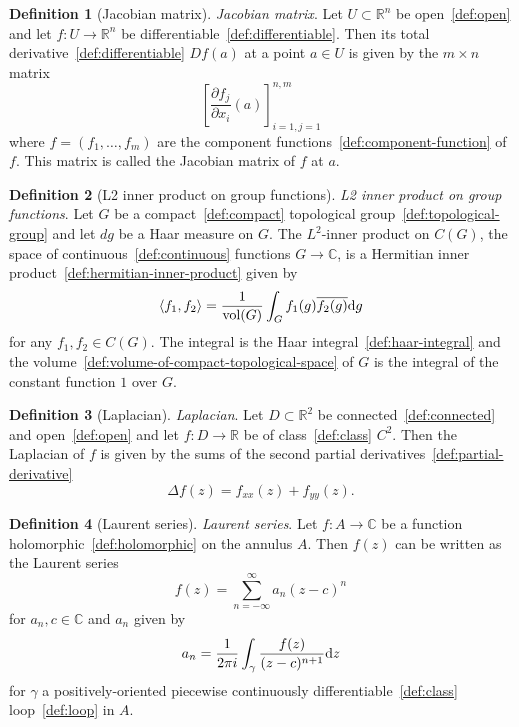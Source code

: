 \documentclass[12pt,a4paper]{article}
\theoremstyle{definition}
\newtheorem{definition}{Definition}
\begin{document}
\begin{definition}[Jacobian matrix]\label{def:jacobian-matrix}
\emph{Jacobian matrix}. Let $U \subset \mathbb R^n$ be open~\ref{def:open} and let $f:U\to\mathbb R^n$ be differentiable~\ref{def:differentiable}. Then its total derivative~\ref{def:differentiable} $Df(a)$ at a point $a\in U$ is given by the $m\times n$ matrix $$\left[ \frac{\partial f_j}{\partial x_i}(a)\right]_{i=1,j=1}^{n,m}$$ where $f = (f_1,\dots, f_m)$ are the component functions~\ref{def:component-function} of $f$. This matrix is called the Jacobian matrix of $f$ at $a$.
\end{definition}

\begin{definition}[L2 inner product on group functions]\label{def:l2-inner-product-on-group-functions}
\emph{L2 inner product on group functions}. Let $G$ be a compact~\ref{def:compact} topological group~\ref{def:topological-group} and let $dg$ be a Haar measure on $G$. The $L^2$-inner product on $C(G)$, the space of continuous~\ref{def:continuous} functions $G\to \mathbb C$, is a Hermitian inner product~\ref{def:hermitian-inner-product} given by $$\langle f_1,f_2\rangle = \frac{1}{\text{vol}(G)}\int_G f_1(g)\overline{f_2(g)}\text dg$$ for any $f_1,f_2\in C(G)$. The integral is the Haar integral~\ref{def:haar-integral} and the volume~\ref{def:volume-of-compact-topological-space} of $G$ is the integral of the constant function $1$ over $G$.
\end{definition}

\begin{definition}[Laplacian]\label{def:laplacian}
\emph{Laplacian}. Let $D\subset\mathbb R^2$ be connected~\ref{def:connected} and open~\ref{def:open} and let $f:D\to \mathbb R$ be of class~\ref{def:class} $C^2$. Then the Laplacian of $f$ is given by the sums of the second partial derivatives~\ref{def:partial-derivative} $$\Delta f(z) = f_{xx}(z) + f_{yy}(z).$$
\end{definition}

\begin{definition}[Laurent series]\label{def:laurent-series}
\emph{Laurent series}. Let $f:A\to \mathbb C$ be a function holomorphic~\ref{def:holomorphic} on the annulus $A$. Then $f(z)$ can be written as the Laurent series $$f(z) = \sum_{n=-\infty}^\infty a_n (z-c)^n$$ for $a_n,c\in \mathbb C$ and $a_n$ given by $$a_n = \frac{1}{2\pi i} \int_\gamma \frac{f(z)}{(z-c)^{n+1}}\text dz$$ for $\gamma$ a positively-oriented piecewise continuously differentiable~\ref{def:class} loop~\ref{def:loop} in $A$.
\end{definition}
\end{document}
